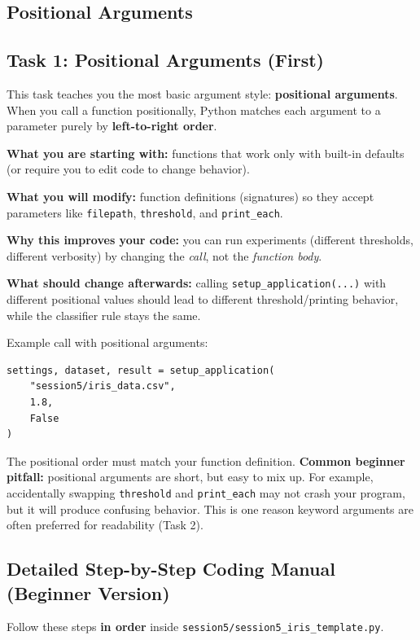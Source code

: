 \subsection{Positional Arguments}
\subsection{Task 1: Positional Arguments (First)}
This task teaches you the most basic argument style: \textbf{positional arguments}.
When you call a function positionally, Python matches each argument to a parameter purely by \textbf{left-to-right order}.

\noindent
\textbf{What you are starting with:} functions that work only with built-in defaults (or require you to edit code to change behavior).

\noindent
\textbf{What you will modify:} function definitions (signatures) so they accept parameters like \texttt{filepath}, \texttt{threshold}, and \texttt{print\_each}.

\noindent
\textbf{Why this improves your code:} you can run experiments (different thresholds, different verbosity) by changing the \textit{call}, not the \textit{function body}.

\noindent
\textbf{What should change afterwards:} calling \texttt{setup\_application(...)} with different positional values should lead to different threshold/printing behavior, while the classifier rule stays the same.

Example call with positional arguments:
\begin{verbatim}
settings, dataset, result = setup_application(
    "session5/iris_data.csv",
    1.8,
    False
)
\end{verbatim}

The positional order must match your function definition.
\noindent
\textbf{Common beginner pitfall:} positional arguments are short, but easy to mix up.
For example, accidentally swapping \texttt{threshold} and \texttt{print\_each} may not crash your program, but it will produce confusing behavior.
This is one reason keyword arguments are often preferred for readability (Task 2).

\subsection{Detailed Step-by-Step Coding Manual (Beginner Version)}
Follow these steps \textbf{in order} inside \texttt{session5/session5\_iris\_template.py}.

